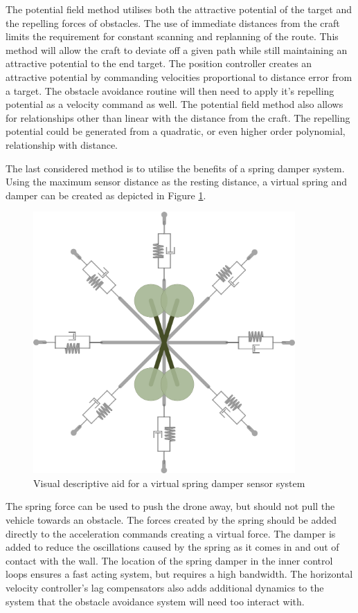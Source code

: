 			The potential field method utilises both the attractive potential of the target and the repelling forces of obstacles. The use of immediate distances from the craft limits the requirement for constant scanning and replanning of the route. This method will allow the craft to deviate off a given path while still maintaining an attractive potential to the end target. The position controller creates an attractive potential by commanding velocities proportional to distance error from a target. The obstacle avoidance routine will then need to apply it's repelling potential as a velocity command as well. The potential field method also allows for relationships other than linear with the distance from the craft. The repelling potential could be generated from a quadratic, or even higher order polynomial, relationship with distance.
			
			The last considered method is to utilise the benefits of a spring damper system. Using the maximum sensor distance as the resting distance, a virtual spring and damper can be created as depicted in Figure \ref{IM_SpringDamper}.
			
			\begin{figure}[H]
				\centering
				\includegraphics[height = 10cm]{../References/Diagrams/SpringDamper.jpg}     
				\caption{Visual descriptive aid for a virtual spring damper sensor system}
				\label{IM_SpringDamper}
			\end{figure}
					
			The spring force can be used to push the drone away, but should not pull the vehicle towards an obstacle. The forces created by the spring should be added directly to the acceleration commands creating a virtual force. The damper is added to reduce the oscillations caused by the spring as it comes in and out of contact with the wall. The location of the spring damper in the inner control loops ensures a fast acting system, but requires a high bandwidth. The horizontal velocity controller's lag compensators also adds additional dynamics to the system that the obstacle avoidance system will need too interact with.
			
